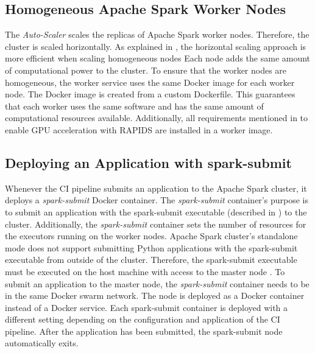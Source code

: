 \subsection{Homogeneous Apache Spark Worker Nodes}
The \textit{Auto-Scaler} scales the replicas of Apache Spark worker nodes. Therefore, the cluster is scaled horizontally. As explained in , the horizontal scaling approach is more efficient when scaling homogeneous nodes Each node adds the same amount of computational power to the cluster.
To ensure that the worker nodes are homogeneous, the worker service uses the same Docker image for each worker node. The Docker image is created from a custom Dockerfile.
This guarantees that each worker uses the same software and has the same amount of computational resources available.
Additionally, all requirements mentioned in  to enable GPU acceleration with RAPIDS are installed in a worker image.


\subsection{Deploying an Application with spark-submit}
\label{subsec:05_spark_spark-submit}
Whenever the CI pipeline submits an application to the Apache Spark cluster, it deploys a \textit{spark-submit} Docker container.
The \textit{spark-submit} container's purpose is to submit an application with the spark-submit executable (described in ) to the cluster.
Additionally, the \textit{spark-submit} container sets the number of resources for the executors running on the worker nodes.
Apache Spark cluster's standalone mode does not support submitting Python applications with the spark-submit executable from outside of the cluster. Therefore, the spark-submit executable must be executed on the host machine with access to the master node \cite{Apache2020Spark}.
To submit an application to the master node, the \textit{spark-submit} container needs to be in the same Docker swarm network. The node is deployed as a Docker container instead of a Docker service. Each spark-submit container is deployed with a different setting depending on the configuration and application of the CI pipeline.
After the application has been submitted, the spark-submit node automatically exits.


